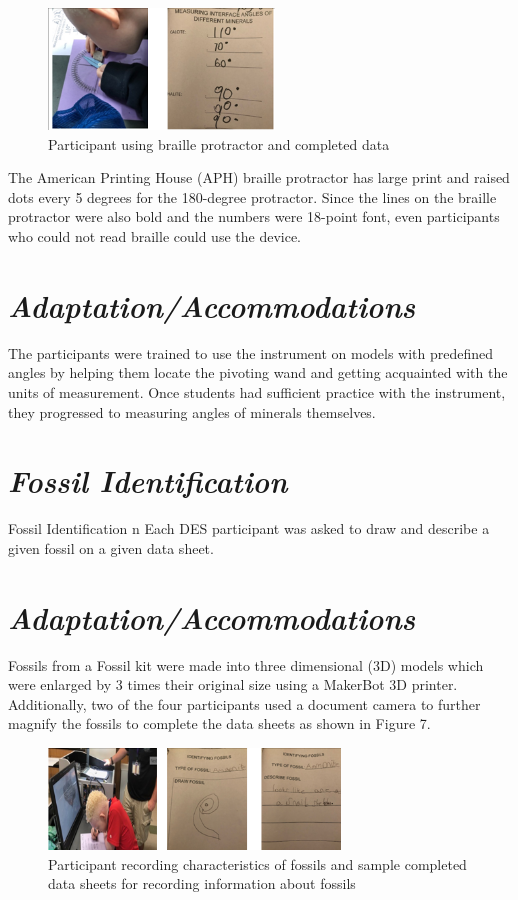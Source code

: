 \documentclass[11pt]{sig-alternate}
\begin{document}
\begin{large}
{\begin{figure}[htp] 
    \leftmargin
    \includegraphics[width=60mm]{figure6.png}
    \caption{Participant using braille protractor and completed data  }
    \label{ participant using braille protractor and completed data  }
\end{figure}
}
The American Printing House (APH) braille protractor has large print and raised dots every 5 degrees for the 180-degree protractor. Since the lines on the braille protractor were also bold and the numbers were 18-point font, even participants who could not read braille could use the device. 
\section*{\textit{Adaptation/Accommodations}}
The participants were trained to use the instrument on models with predefined angles by helping them locate the pivoting wand and getting acquainted with the units of measurement. Once students had sufficient practice with the instrument, they progressed to measuring angles of minerals themselves. 
\section*{\textit{Fossil Identification}}Fossil Identification
n Each DES participant was asked to draw and describe a given fossil on a given data sheet. 

\section*{\textit{Adaptation/Accommodations}}

 Fossils from a Fossil kit were made into three dimensional (3D) models which were enlarged by 3 times their original size using a MakerBot 3D printer.  Additionally, two of the four participants used a document camera to further magnify the fossils to complete the data sheets as shown in Figure 7.
{\begin{figure}[htp] 
    \leftmargin
    \includegraphics[width=7.75cm]{figure7.png}
    \caption{Participant recording characteristics of fossils and sample completed data sheets for recording information about fossils }
    \label{ Participant recording characteristics of fossils and sample completed data sheets for recording information about fossils }
\end{figure}
}



\end{large}
\end{document}
